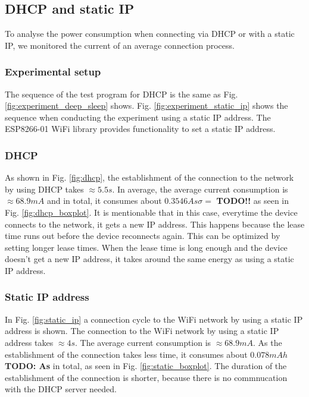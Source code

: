 \subsection{DHCP and static IP}
To analyse the power consumption when connecting via DHCP or with a static IP, we monitored the current of an average connection process.\\

\subsubsection{Experimental setup}
The sequence of the test program for DHCP is the same as Fig. \ref{fig:experiment_deep_sleep} shows.
Fig. \ref{fig:experiment_static_ip} shows the sequence when conducting the experiment using a static IP address.
The ESP8266-01 WiFi library provides functionality to set a static IP address.\\

\subsubsection{DHCP}
As shown in Fig. \ref{fig:dhcp}, the establishment of the connection to the network by using DHCP takes $\approx 5.5 s$.
In average, the average current consumption is $\approx 68.9 mA$ and in total, it consumes about $0.3546 As \sigma = $ \textbf{TODO!!} as seen in Fig. \ref{fig:dhcp_boxplot}.
It is mentionable that in this case, everytime the device connects to the network, it gets a new IP address. 
This happens because the lease time runs out before the device reconnects again.
This can be optimized by setting longer lease times. 
When the lease time is long enough and the device doesn't get a new IP address, it takes around the same energy as using a static IP address.\\

\subsubsection{Static IP address}
In Fig. \ref{fig:static_ip} a connection cycle to the WiFi network by using a static IP address is shown. 
The connection to the WiFi network by using a static IP address takes $\approx 4 s$. 
The average current consumption is $\approx 68.9 mA$.
As the establishment of the connection takes less time, it consumes about $0.078 mAh$ \textbf{TODO: As} in total, as seen in Fig. \ref{fig:static_boxplot}.
The duration of the establishment of the connection is shorter, because there is no commnucation with the DHCP server needed.



